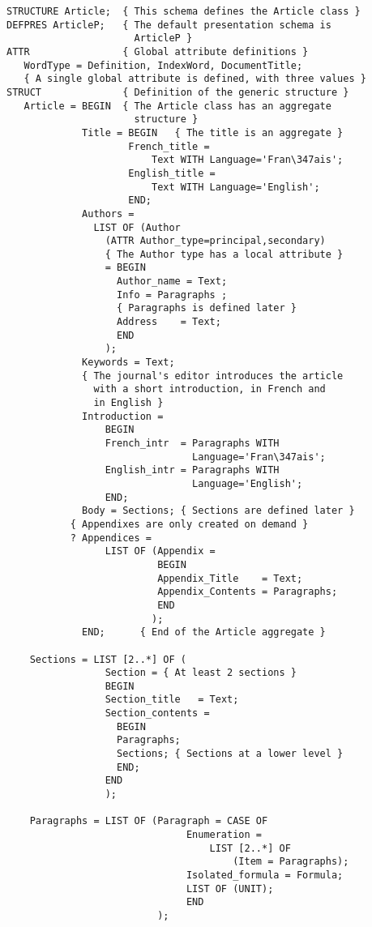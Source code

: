 \begin{verbatim}
STRUCTURE Article;  { This schema defines the Article class }
DEFPRES ArticleP;   { The default presentation schema is
                      ArticleP }
ATTR                { Global attribute definitions }
   WordType = Definition, IndexWord, DocumentTitle;
   { A single global attribute is defined, with three values }
STRUCT              { Definition of the generic structure }
   Article = BEGIN  { The Article class has an aggregate
                      structure }
             Title = BEGIN   { The title is an aggregate }
                     French_title = 
                         Text WITH Language='Fran\347ais';
                     English_title =
                         Text WITH Language='English';
                     END;
             Authors = 
               LIST OF (Author
                 (ATTR Author_type=principal,secondary)
                 { The Author type has a local attribute }
                 = BEGIN
                   Author_name = Text;
                   Info = Paragraphs ;
                   { Paragraphs is defined later }
                   Address    = Text;
                   END
                 );
             Keywords = Text;
             { The journal's editor introduces the article
               with a short introduction, in French and
               in English }
             Introduction = 
                 BEGIN
                 French_intr  = Paragraphs WITH
                                Language='Fran\347ais';
                 English_intr = Paragraphs WITH
                                Language='English';
                 END;
             Body = Sections; { Sections are defined later }
		   { Appendixes are only created on demand }
           ? Appendices = 
                 LIST OF (Appendix =
                          BEGIN
                          Appendix_Title    = Text;
                          Appendix_Contents = Paragraphs;
                          END
                         );
             END;      { End of the Article aggregate }

    Sections = LIST [2..*] OF (
                 Section = { At least 2 sections }
                 BEGIN
                 Section_title   = Text;
                 Section_contents =
                   BEGIN
                   Paragraphs;
                   Sections; { Sections at a lower level }
                   END;
                 END
                 );

    Paragraphs = LIST OF (Paragraph = CASE OF
                               Enumeration = 
                                   LIST [2..*] OF
                                       (Item = Paragraphs);
                               Isolated_formula = Formula;
                               LIST OF (UNIT);
                               END
                          );


\end{verbatim}
